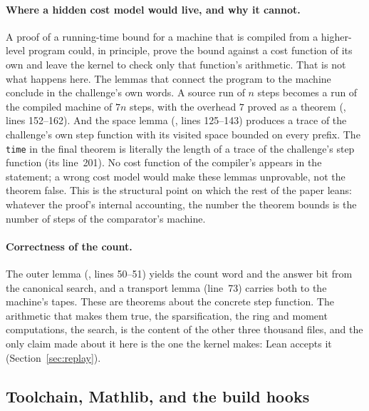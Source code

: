 \paragraph{Where a hidden cost model would live, and why it cannot.}
A proof of a running-time bound for a machine that is compiled from a
higher-level program could, in principle, prove the bound against a cost
function of its own and leave the kernel to check only that function's
arithmetic. That is not what happens here. The lemmas that connect the
program to the machine conclude in the challenge's own words. A source
run of $n$ steps becomes a run of the compiled machine of $7n$ steps,
with the overhead $7$ proved as a theorem
(, lines 152--162). And the
space lemma (, lines 125--143)
produces a trace of the challenge's own step function with its visited
space bounded on every prefix. The \texttt{time} in the final theorem is
literally the length of a trace of the challenge's step function (its
line~201). No cost function of the compiler's appears in the statement;
a wrong cost model would make these lemmas unprovable, not the theorem
false. This is the structural point on which the rest of the paper
leans: whatever the proof's internal accounting, the number the theorem
bounds is the number of steps of the comparator's machine.

\paragraph{Correctness of the count.} The outer lemma
(, lines 50--51) yields the
count word and the answer bit from the canonical search, and a transport
lemma (line~73) carries both to the machine's tapes. These are theorems
about the concrete step function. The arithmetic that makes them true,
the sparsification, the ring and moment computations, the search, is the
content of the other three thousand files, and the only claim made about it here is the one the kernel makes: Lean accepts it (Section~\ref{sec:replay}).

\subsection{Toolchain, Mathlib, and the build hooks}
\label{sec:proof-build}

